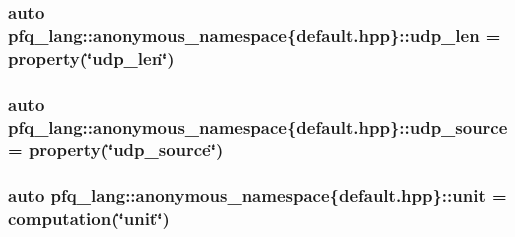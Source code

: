 \hypertarget{namespacepfq__lang_1_1anonymous__namespace_02default_8hpp_03_ab0dcf23db0f218100e7fe51562e0add1}{
\subsubsection[{udp\-\_\-len}]{\setlength{\rightskip}{0pt plus 5cm}auto pfq\-\_\-lang\-::anonymous\-\_\-namespace\{default.\-hpp\}\-::udp\-\_\-len = {\bf property}(\char`\"{}udp\-\_\-len\char`\"{})}}\label{namespacepfq__lang_1_1anonymous__namespace_02default_8hpp_03_ab0dcf23db0f218100e7fe51562e0add1}
\hypertarget{namespacepfq__lang_1_1anonymous__namespace_02default_8hpp_03_a7d2943522cfb795fcb82c894dba83292}{
\subsubsection[{udp\-\_\-source}]{\setlength{\rightskip}{0pt plus 5cm}auto pfq\-\_\-lang\-::anonymous\-\_\-namespace\{default.\-hpp\}\-::udp\-\_\-source = {\bf property}(\char`\"{}udp\-\_\-source\char`\"{})}}\label{namespacepfq__lang_1_1anonymous__namespace_02default_8hpp_03_a7d2943522cfb795fcb82c894dba83292}
\hypertarget{namespacepfq__lang_1_1anonymous__namespace_02default_8hpp_03_ae78caafebdc64f9180032a049b7c3b3a}{
\subsubsection[{unit}]{\setlength{\rightskip}{0pt plus 5cm}auto pfq\-\_\-lang\-::anonymous\-\_\-namespace\{default.\-hpp\}\-::unit = {\bf computation}(\char`\"{}unit\char`\"{})}}\label{namespacepfq__lang_1_1anonymous__namespace_02default_8hpp_03_ae78caafebdc64f9180032a049b7c3b3a}

